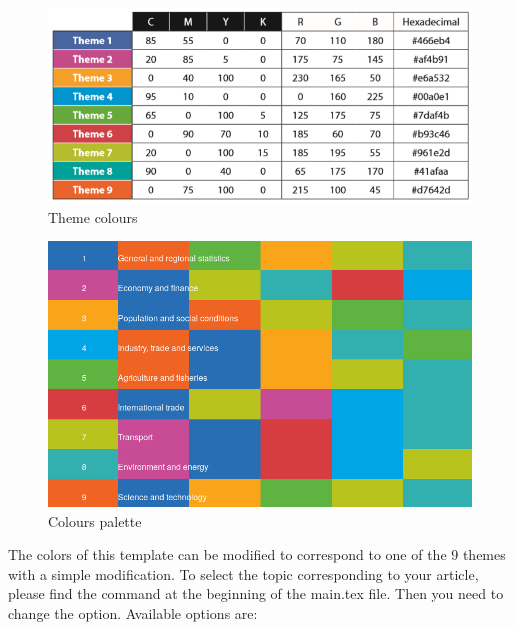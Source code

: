 \documentclass[Theme1]{{template_material/eurostat}}
\begin{document}
\begin{figure}[h]
    \caption{Theme colours} %
    \label{fig:themecolours}
    \includegraphics[width=1\textwidth]{template_material/FiguresFiles/Theme_colours.PNG}
\end{figure}

\begin{figure}[h]
    \caption{Colours palette} %
    \label{fig:themecolourspalette}
    \includegraphics[width=1\textwidth]{template_material/FiguresFiles/themes_colours_palette.png}
\end{figure}

\newpage
The colors of this template can be modified to correspond to one of the 9 themes with a simple modification. To select the topic corresponding to your article, please find the command  at the beginning of the main.tex file. Then you need to change the option. Available options are:
\end{document}
